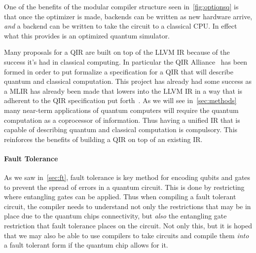 One of the benefits of the modular compiler structure seen in~\cref{fig:optionsq} is that once the optimizer is made, backends can be written as new hardware arrive, \emph{and} a backend can be written to take the circuit to a classical \ac{CPU}.
In effect what this provides is an optimized quantum simulator.

Many proposals for a \ac{QIR} are built on top of the LLVM \ac{IR} because of the success it's had in classical computing.
In particular the QIR Alliance~\cite{qir} has been formed in order to put formalize a specification for a \ac{QIR} that will describe quantum and classical computation.
This project has already had some success as a \ac{MLIR} has already been made that lowers into the LLVM \ac{IR} in a way that is adherent to the \ac{QIR} specification put forth~\cite{mlirquantum}.
As we will see in~\cref{sec:methods} many near-term applications of quantum computers will require the quantum computation as a coprocessor of information.
Thus having a unified \ac{IR} that is capable of describing quantum and classical computation is compulsory.
This reinforces the benefits of building a \ac{QIR} on top of an existing \ac{IR}.


\paragraph{Fault Tolerance}
As we saw in~\cref{sec:ft}, fault tolerance is key method for encoding qubits and gates to prevent the spread of errors in a quantum circuit.
This is done by restricting where entangling gates can be applied.
Thus when compiling a fault tolerant circuit, the compiler needs to understand not only the restrictions that may be in place due to the quantum chips connectivity, but \emph{also} the entangling gate restriction that fault tolerance places on the circuit.
Not only this, but it is hoped that we may also be able to use compilers to take circuits and compile them \emph{into} a fault tolerant form if the quantum chip allows for it.

